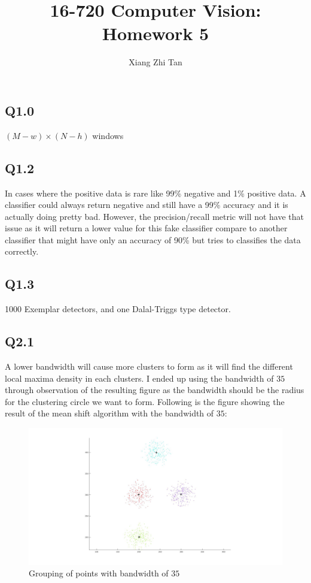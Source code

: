\documentclass{article}
\begin{document}
\title{16-720 Computer Vision: Homework 5}
\author{Xiang Zhi Tan}

\maketitle
\subsection*{Q1.0}
$(M - w) \times (N - h)$ windows

\subsection*{Q1.2}
In cases where the positive data is rare like 99\% negative and 1\% positive data. A classifier could always return negative and still have a 99\% accuracy and it is actually doing pretty bad. However, the precision/recall metric will not have that issue as it will return a lower value for this fake classifier compare to another classifier that might have only an accuracy of 90\% but tries to classifies the data correctly.

\subsection*{Q1.3}
1000 Exemplar detectors, and one Dalal-Triggs type detector.


\subsection*{Q2.1}
A lower bandwidth will cause more clusters to form as it will find the different local maxima density in each clusters. I ended up using the bandwidth of $35$ through observation of the resulting figure as the bandwidth should be the radius for the clustering circle we want to form. Following is the figure showing the result of the mean shift algorithm with the bandwidth of $35$:
\begin{figure}[H]
    \centering
    \includegraphics[width=6.5in]{./figures/q21_35.jpg}
    \caption{Grouping of points with bandwidth of $35$}
\end{figure}
\end{document}
